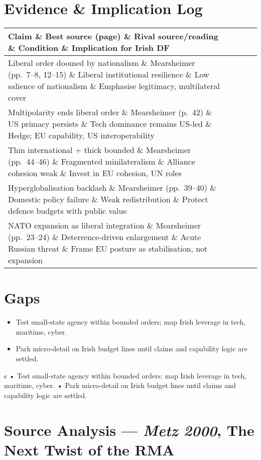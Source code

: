 \section*{Evidence \& Implication Log}
\begin{tabular}{p{3.2cm}p{4.2cm}p{3.6cm}p{3.2cm}p{4.2cm}}
	\textbf{Claim} \& \textbf{Best source (page)} \& \textbf{Rival source/reading} \& \textbf{Condition} \& \textbf{Implication for Irish DF}\\\hline
	Liberal order doomed by nationalism \& Mearsheimer (pp.~7--8, 12--15) \& Liberal institutional resilience \& Low salience of nationalism \& Emphasise legitimacy, multilateral cover\\
	Multipolarity ends liberal order \& Mearsheimer (p.~42) \& US primacy persists \& Tech dominance remains US-led \& Hedge; EU capability, US interoperability\\
	Thin international + thick bounded \& Mearsheimer (pp.~44--46) \& Fragmented minilateralism \& Alliance cohesion weak \& Invest in EU cohesion, UN roles\\
	Hyperglobalisation backlash \& Mearsheimer (pp.~39--40) \& Domestic policy failure \& Weak redistribution \& Protect defence budgets with public value\\
	NATO expansion as liberal integration \& Mearsheimer (pp.~23--24) \& Deterrence-driven enlargement \& Acute Russian threat \& Frame EU posture as stabilisation, not expansion\\
\end{tabular}

\section*{Gaps}
\begin{itemize}
	\item Test small-state agency within bounded orders; map Irish leverage in tech, maritime, cyber.
	\item Park micro-detail on Irish budget lines until claims and capability logic are settled.
\end{itemize}
s
• Test small-state agency within bounded orders; map Irish leverage in tech, maritime, cyber.
• Park micro-detail on Irish budget lines until claims and capability logic are settled.

\parencite{METZ_2000}

\section*{Source Analysis — \textit{Metz 2000}, The Next Twist of the RMA}

